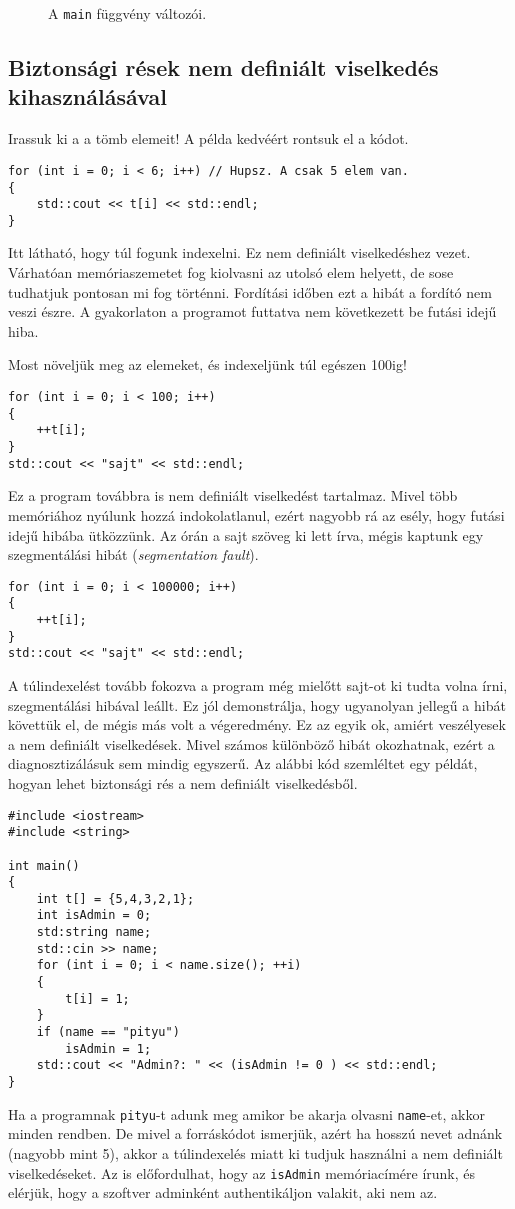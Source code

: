 \documentclass[../cpp_book/cpp_book.tex]{subfiles}
\begin{document}
	\begin{figure}[!h]
		\centering
		
		
		\caption{A \texttt{main} függvény változói.}\label{fig_stack_array}
	\end{figure}
	\subsection{Biztonsági rések nem definiált viselkedés kihasználásával}
	Irassuk ki a a tömb elemeit! A példa kedvéért rontsuk el a kódot.
		\begin{lstlisting}
for (int i = 0; i < 6; i++) // Hupsz. A csak 5 elem van.
{
	std::cout << t[i] << std::endl;
}
	\end{lstlisting} 
	Itt látható, hogy túl fogunk indexelni. Ez {nem definiált viselkedés}hez vezet. Várhatóan memóriaszemetet fog kiolvasni az utolsó elem helyett, de sose tudhatjuk pontosan mi fog történni. Fordítási időben ezt a hibát a fordító nem veszi észre. A gyakorlaton a programot futtatva nem következett be futási idejű hiba.
	
	Most növeljük meg az elemeket, és indexeljünk túl egészen 100ig!
	\begin{lstlisting}
for (int i = 0; i < 100; i++)
{
	++t[i];
}
std::cout << "sajt" << std::endl;
	\end{lstlisting} 
	Ez a program továbbra is nem definiált viselkedést tartalmaz. Mivel több memóriához nyúlunk hozzá indokolatlanul, ezért nagyobb rá az esély, hogy futási idejű hibába ütközzünk. Az órán a {sajt} szöveg ki lett írva, mégis kaptunk egy szegmentálási hibát (\textit{segmentation fault}).
	
	\begin{lstlisting}
for (int i = 0; i < 100000; i++)
{
	++t[i];
}
std::cout << "sajt" << std::endl;
	\end{lstlisting} 
	A túlindexelést tovább fokozva a program még mielőtt sajt-ot ki tudta volna írni, szegmentálási hibával leállt. Ez jól demonstrálja, hogy ugyanolyan jellegű  a hibát követtük el, de mégis más volt a végeredmény. Ez az egyik ok, amiért veszélyesek a nem definiált viselkedések. Mivel számos különböző hibát okozhatnak, ezért a diagnosztizálásuk sem mindig egyszerű. Az alábbi kód szemléltet egy példát, hogyan lehet biztonsági rés a nem definiált viselkedésből.
	\begin{lstlisting}
#include <iostream>
#include <string>

int main()
{
	int t[] = {5,4,3,2,1};
	int isAdmin = 0;
	std:string name;
	std::cin >> name;
	for (int i = 0; i < name.size(); ++i)
	{
		t[i] = 1;
	}
	if (name == "pityu")
		isAdmin = 1;
	std::cout << "Admin?: " << (isAdmin != 0 ) << std::endl;
}
	\end{lstlisting}
	Ha a programnak \texttt{pityu}-t adunk meg amikor be akarja olvasni \texttt{name}-et, akkor minden rendben. De mivel a forráskódot ismerjük, azért ha hosszú nevet adnánk (nagyobb mint 5), akkor a túlindexelés miatt ki tudjuk használni a nem definiált viselkedéseket. Az is előfordulhat, hogy az \texttt{isAdmin} memóriacímére írunk, és elérjük, hogy a szoftver adminként authentikáljon valakit, aki nem az.
	\medskip
	
\end{document}
